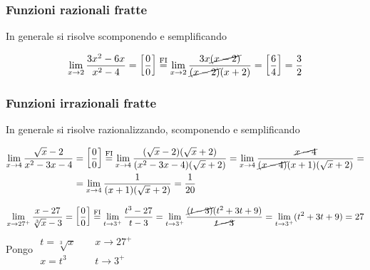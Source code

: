 \documentclass{book}     %
\begin{document}
\subsubsection{Funzioni razionali fratte}
In generale si risolve scomponendo e semplificando
\begin{ex}
\[\lim_{x\to 2} \frac{3x^2-6x}{x^2-4}= \left[\frac{0}{0}\right]\overset{\mathrm{FI}}{=}\lim_{x\to 2}\frac{3x\cancel{(x-2)}}{{\cancel{(x-2)}}(x+2)}=\left[\frac{6}{4}\right]=\frac{3}{2}\]
\end{ex}
\subsubsection{Funzioni irrazionali fratte}
In generale si risolve razionalizzando, scomponendo e semplificando
\begin{ex}
\[\begin{aligned}\lim_{x\to 4}\frac{\sqrt{x}-2}{x^2-3x-4}&= \left[\frac{0}{0}\right]\overset{\mathrm{FI}}{=}\lim_{x\to 4}\frac{(\sqrt{x}-2)(\sqrt{x}+2)}{(x^2-3x-4)(\sqrt{x}+2)}=\lim_{x\to 4}\frac{\cancel{x-4}}{\cancel{(x-4)}(x+1)(\sqrt{x}+2)} =\\&=\lim_{x\to 4}\frac{1}{(x+1)(\sqrt{x}+2)}=\frac{1}{20}\end{aligned}\]
\end{ex}
\begin{ex}
\[\lim_{x\to27^+}\frac{x-27}{\sqrt[3]{x}-3}=\left[\frac{0}{0}\right]\overset{\mathrm{FI}}{=}\lim_{t\to3^+}\frac{t^3-27}{t-3}=\lim_{t\to3^+}\frac{\cancel{(t-3)}(t^2+3t+9)}{\cancel{t-3}}=\lim_{t\to3^+}(t^2+3t+9)=27\]
Pongo $\begin{array}{ll}
    t=\sqrt[3]{x}~~~~~ &  x\to27^+\\
    x=t^3 & t\to 3^+
\end{array}$
\end{ex}
\end{document}
